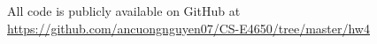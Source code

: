 All code is publicly available on GitHub at \url{https://github.com/ancuongnguyen07/CS-E4650/tree/master/hw4}